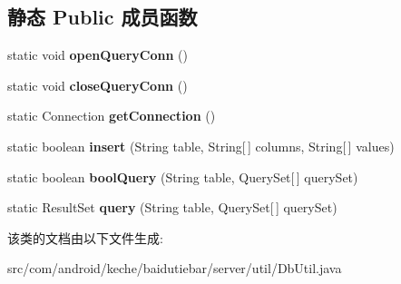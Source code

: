 \subsection*{静态 Public 成员函数}
\begin{DoxyCompactItemize}
\item 
\mbox{\label{classcom_1_1android_1_1keche_1_1baidutiebar_1_1server_1_1util_1_1_db_util_a3e4db4ca2486a8f5d892d426e9a51645}} 
static void {\bfseries open\+Query\+Conn} ()
\item 
\mbox{\label{classcom_1_1android_1_1keche_1_1baidutiebar_1_1server_1_1util_1_1_db_util_aa696cdc92d215223ee87d1d0f4e0a9d9}} 
static void {\bfseries close\+Query\+Conn} ()
\item 
\mbox{\label{classcom_1_1android_1_1keche_1_1baidutiebar_1_1server_1_1util_1_1_db_util_a79be35dc46a4cfbbd3b578b7cfa5e802}} 
static Connection {\bfseries get\+Connection} ()
\item 
\mbox{\label{classcom_1_1android_1_1keche_1_1baidutiebar_1_1server_1_1util_1_1_db_util_a7aeb1bf476a322d519d74d2ea48397f5}} 
static boolean {\bfseries insert} (String table, String\mbox{[}$\,$\mbox{]} columns, String\mbox{[}$\,$\mbox{]} values)
\item 
\mbox{\label{classcom_1_1android_1_1keche_1_1baidutiebar_1_1server_1_1util_1_1_db_util_a4098df8ccbf5834db16e9aeeefc8fc01}} 
static boolean {\bfseries bool\+Query} (String table, Query\+Set\mbox{[}$\,$\mbox{]} query\+Set)
\item 
\mbox{\label{classcom_1_1android_1_1keche_1_1baidutiebar_1_1server_1_1util_1_1_db_util_a2fd882c27309da24d8dba1dec09a4b7b}} 
static Result\+Set {\bfseries query} (String table, Query\+Set\mbox{[}$\,$\mbox{]} query\+Set)
\end{DoxyCompactItemize}


该类的文档由以下文件生成\+:\begin{DoxyCompactItemize}
\item 
src/com/android/keche/baidutiebar/server/util/Db\+Util.\+java\end{DoxyCompactItemize}
